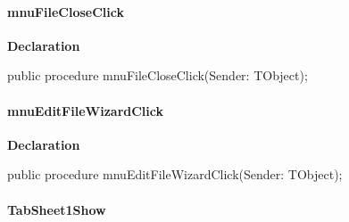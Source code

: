 \documentclass{report}
\newif\ifpdf
\begin{document}
\paragraph*{mnuFileCloseClick}\hspace*{\fill}

\label{editor.TfrmEditor-mnuFileCloseClick}
\begin{list}{}{
\setlength{\itemindent}{0cm}
\setlength{\listparindent}{0cm}
\setlength{\leftmargin}{\evensidemargin}
\addtolength{\leftmargin}{\tmplength}
\settowidth{\labelsep}{X}
\addtolength{\leftmargin}{\labelsep}
\setlength{\labelwidth}{\tmplength}
}
\item[\textbf{Declaration}\hfill]
\ifpdf
\begin{flushleft}
\fi
\begin{ttfamily}
public procedure mnuFileCloseClick(Sender: TObject);\end{ttfamily}

\ifpdf
\end{flushleft}
\fi

\end{list}
\paragraph*{mnuEditFileWizardClick}\hspace*{\fill}

\label{editor.TfrmEditor-mnuEditFileWizardClick}
\begin{list}{}{
\setlength{\itemindent}{0cm}
\setlength{\listparindent}{0cm}
\setlength{\leftmargin}{\evensidemargin}
\addtolength{\leftmargin}{\tmplength}
\settowidth{\labelsep}{X}
\addtolength{\leftmargin}{\labelsep}
\setlength{\labelwidth}{\tmplength}
}
\item[\textbf{Declaration}\hfill]
\ifpdf
\begin{flushleft}
\fi
\begin{ttfamily}
public procedure mnuEditFileWizardClick(Sender: TObject);\end{ttfamily}

\ifpdf
\end{flushleft}
\fi

\end{list}
\paragraph*{TabSheet1Show}\hspace*{\fill}
\end{document}
